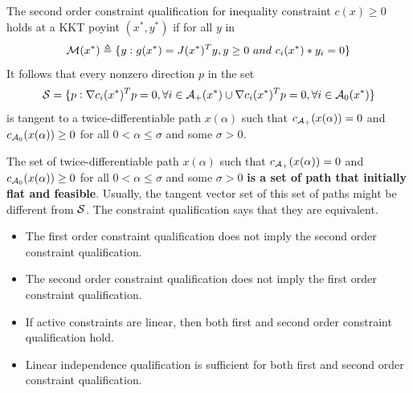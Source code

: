 \begin{refsection}
\begin{definition}
The second order constraint qualification for inequality constraint $c(x)\geq 0$ holds at a KKT poyint $(x^*,y^*)$ if for all $y$ in 
$$\mathcal{M}(x^*) \triangleq \{y: g(x^*) = J(x^*)^Ty, y\geq 0 ~and~ c_i(x^*)*y_i = 0\}$$
It follows that every nonzero direction $p$ in the set
	$$\mathcal{S}=\{p:\nabla c_i(x^*)^Tp = 0, \forall i\in \mathcal{A}_+(x^*) \cup \nabla c_i(x^*)^Tp = 0, \forall i\in \mathcal{A}_0(x^*)\}$$ 
is tangent to a twice-differentiable path $x(\alpha)$ such that $c_{\mathcal{A}_+}(x(\alpha)) = 0$ and $c_{\mathcal{A}_0}(x(\alpha)) \geq 0$ for all $0 < \alpha \leq \sigma$ and some $\sigma > 0$.
\end{definition}

\begin{remark}[interpretation]
The set of twice-differentiable path $x(\alpha)$ such that $c_{\mathcal{A}_+}(x(\alpha)) = 0$ and $c_{\mathcal{A}_0}(x(\alpha)) \geq 0$ for all $0 < \alpha \leq \sigma$ and some $\sigma > 0$ \textbf{is a set of path that initially flat and feasible}. Usually, the tangent vector set of this set of paths might be different from $\mathcal{S}$. The constraint qualification says that they are equivalent.
\end{remark}



\begin{remark}\hfill
\begin{itemize}
	\item The first order constraint qualification does not imply the second order constraint qualification.
	\item The second order constraint qualification does not imply the first order constraint qualification.
	\item If active constraints are linear, then both first and second order constraint qualification hold.
	\item Linear independence qualification is sufficient for both first and second order constraint qualification.
\end{itemize}
\end{remark}






\end{refsection}
